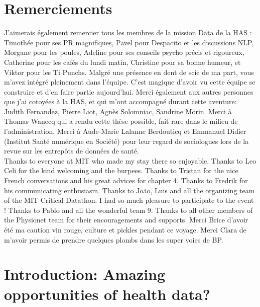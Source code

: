 \documentclass[french,12pt,twoside,a4paper]{book}
\begin{document}
\newpage
\chapter*{Remerciements}

J'aimerais également remercier tous les membres de la mission Data de la HAS :
Timothée pour ses PR magnifiques, Pavel pour Despacito et les discussions NLP,
Morgane pour les poules, Adeline pour ses conseils \sout{psycho} précis et
rigoureux, Catherine pour les cafés du lundi matin, Christine pour sa bonne
humeur, et Viktor pour les Ti Punchs. Malgré une présence en dent de scie de ma
part, vous m'avez intégré pleinement dans l'équipe. C'est magique d'avoir vu
cette équipe se construire et d'en faire partie aujourd'hui. Merci également aux
autres personnes que j'ai cotoyées à la HAS, et qui m'ont accompagné durant
cette aventure: Judith Fernandez, Pierre Liot, Agnès Solomniac, Sandrine Morin.
Merci à Thomas Wanecq qui a rendu cette thèse possible, fait rare dans le milieu
de l'administration. Merci à Aude-Marie Lalanne Berdouticq et Emmanuel Didier
(Institut Santé numérique en Société) pour leur regard de sociologues lors de la
revue sur les entrepôts de données de santé.\\

Thanks to everyone at MIT who made my stay there so enjoyable. Thanks to Leo
Celi for the kind welcoming and the burpees. Thanks to Tristan for the nice
French conversations and his great advices for chapter 4. Thanks to Fredrik for
his communicating enthusiasm. Thanks to João, Luis and all the organizing team
of the MIT Critical Datathon. I had so much pleasure to participate to the event
! Thanks to Pablo and all the wonderful team 9. Thanks to all other members of
the Physionet team for their encouragements and supports. Merci Brice d'avoir
été ma caution vin rouge, culture et pickles pendant ce voyage. Merci Clara de
m'avoir permis de prendre quelques plombs dans les super voies de BP.\\

\pagestyle{basic}%

\newpage
\dominitoc
\tableofcontents

\mainmatter

\chapter{Introduction: Amazing opportunities of health data?}\label{chapter:intro}
\end{document}
